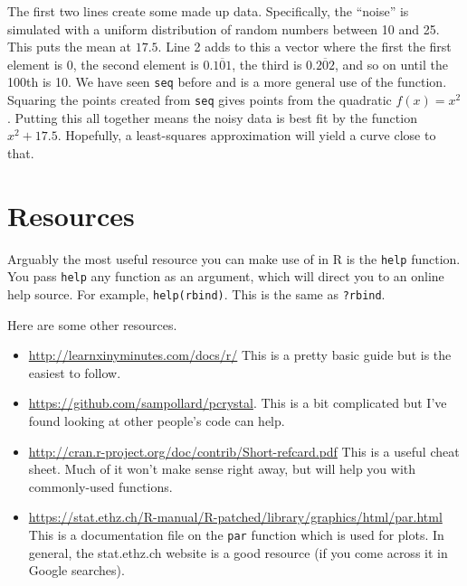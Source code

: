 \documentclass[12pt]{article}
\begin{document}
The first two lines create some made up data. Specifically, the ``noise'' is simulated with a uniform distribution of random numbers between 10 and 25. This puts the mean at $17.5$. Line 2 adds to this a vector where the first the first element is 0, the second element is $0.\overline{101}$, the third is $0.\overline{202}$, and so on until the 100th is 10. We have seen \verb|seq| before and is a more general use of the function. Squaring the points created from \verb|seq| gives points from the quadratic $f(x) = x^2$. Putting this all together means the noisy data is best fit by the function $x^2 + 17.5$. Hopefully, a least-squares approximation will yield a curve close to that.



\section{Resources}
Arguably the most useful resource you can make use of in R is the \verb|help| function. You pass \verb|help| any function as an argument, which will direct you to an online help source. For example, \verb|help(rbind)|. This is the same as \verb|?rbind|.

Here are some other resources.
\begin{itemize}
	\item \url{http://learnxinyminutes.com/docs/r/} This is a pretty basic guide but is the easiest to follow.
	\item \url{https://github.com/sampollard/pcrystal}. This is a bit complicated but I've found looking at other people's code can help.
	\item \url{http://cran.r-project.org/doc/contrib/Short-refcard.pdf} This is a useful cheat sheet. Much of it won't make sense right away, but will help you with commonly-used functions.
	\item \url{https://stat.ethz.ch/R-manual/R-patched/library/graphics/html/par.html} This is a documentation file on the \verb|par| function which is used for plots. In general, the stat.ethz.ch website is a good resource (if you come across it in Google searches).
\end{itemize}
\end{document}
